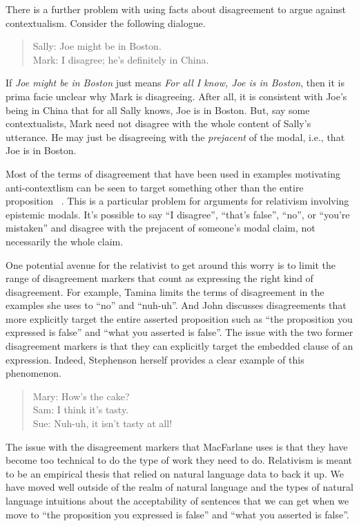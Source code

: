 There is a further problem with using facts about disagreement to argue against contextualism. Consider the following dialogue.

\begin{quote}

Sally: Joe might be in Boston.\\
Mark: I disagree; he's definitely in China.
\end{quote}
If \emph{Joe might be in Boston} just means \emph{For all I know, Joe is in Boston}, then it is prima facie unclear why Mark is disagreeing. After all, it is consistent with Joe's being in China that for all Sally knows, Joe is in Boston. But, say some contextualists, Mark need not disagree with the whole content of Sally's utterance. He may just be disagreeing with the \emph{prejacent} of the modal, i.e., that Joe is in Boston.

Most of the terms of disagreement that have been used in examples motivating anti-contextlism can be seen to target something other than the entire proposition ~\citep[83]{vonFintelGillies2008}. This is a particular problem for arguments for relativism involving epistemic modals. It's possible to say ``I disagree'', ``that's false'', ``no'', or ``you're mistaken'' and disagree with the prejacent of someone's modal claim, not necessarily the whole claim. 

One potential avenue for the relativist to get around this worry is to limit the range of disagreement markers that count as expressing the right kind of disagreement. For example, Tamina  \citet{Stephenson2007} limits the terms of disagreement in the examples she uses to ``no'' and ``nuh-uh''. And John  \citet[11]{MacFarlane2014} discusses disagreements that more explicitly target the entire asserted proposition such as ``the proposition you expressed is false'' and ``what you asserted is false''. The issue with the two former disagreement markers is that they can explicitly target the embedded clause of an expression. Indeed, Stephenson herself provides a clear example of this phenomenon.

\begin{quote}

Mary: How’s the cake?\\
Sam: I think it’s tasty.\\
Sue: Nuh-uh, it isn’t tasty at all! ~\citep[512]{Stephenson2007}
\end{quote}
The issue with the disagreement markers that MacFarlane uses is that they have become too technical to do the type of work they need to do. Relativism is meant to be an empirical thesis that relied on natural language data to back it up. We have moved well outside of the realm of natural language and the types of natural language intuitions about the acceptability of sentences that we can get when we move to “the proposition you expressed is false” and “what you asserted is false”. 

